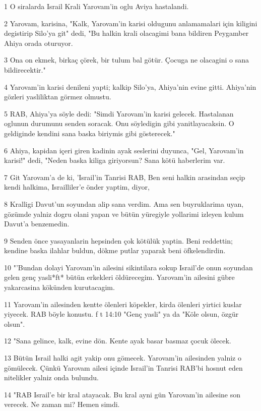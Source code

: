 \par 1 O siralarda Israil Krali Yarovam'in oglu Aviya hastalandi.
\par 2 Yarovam, karisina, "Kalk, Yarovam'in karisi oldugunu anlamamalari için kiligini degistirip Silo'ya git" dedi, "Bu halkin krali olacagimi bana bildiren Peygamber Ahiya orada oturuyor.
\par 3 Ona on ekmek, birkaç çörek, bir tulum bal götür. Çocuga ne olacagini o sana bildirecektir."
\par 4 Yarovam'in karisi denileni yapti; kalkip Silo'ya, Ahiya'nin evine gitti. Ahiya'nin gözleri yasliliktan görmez olmustu.
\par 5 RAB, Ahiya'ya söyle dedi: "Simdi Yarovam'in karisi gelecek. Hastalanan oglunun durumunu senden soracak. Onu söyledigin gibi yanitlayacaksin. O geldiginde kendini sana baska biriymis gibi gösterecek."
\par 6 Ahiya, kapidan içeri giren kadinin ayak seslerini duyunca, "Gel, Yarovam'in karisi!" dedi, "Neden baska kiliga giriyorsun? Sana kötü haberlerim var.
\par 7 Git Yarovam'a de ki, 'Israil'in Tanrisi RAB, Ben seni halkin arasindan seçip kendi halkima, Israilliler'e önder yaptim, diyor,
\par 8 Kralligi Davut'un soyundan alip sana verdim. Ama sen buyruklarima uyan, gözümde yalniz dogru olani yapan ve bütün yüregiyle yollarimi izleyen kulum Davut'a benzemedin.
\par 9 Senden önce yasayanlarin hepsinden çok kötülük yaptin. Beni reddettin; kendine baska ilahlar buldun, dökme putlar yaparak beni öfkelendirdin.
\par 10 "'Bundan dolayi Yarovam'in ailesini sikintilara sokup Israil'de onun soyundan gelen genç yasli*ft* bütün erkekleri öldürecegim. Yarovam'in ailesini gübre yakarcasina kökünden kurutacagim.
\par 11 Yarovam'in ailesinden kentte ölenleri köpekler, kirda ölenleri yirtici kuslar yiyecek. RAB böyle konustu. f t 14:10 "Genç yasli" ya da "Köle olsun, özgür olsun".
\par 12 "Sana gelince, kalk, evine dön. Kente ayak basar basmaz çocuk ölecek.
\par 13 Bütün Israil halki agit yakip onu gömecek. Yarovam'in ailesinden yalniz o gömülecek. Çünkü Yarovam ailesi içinde Israil'in Tanrisi RAB'bi hosnut eden nitelikler yalniz onda bulundu.
\par 14 "RAB Israil'e bir kral atayacak. Bu kral ayni gün Yarovam'in ailesine son verecek. Ne zaman mi? Hemen simdi.
